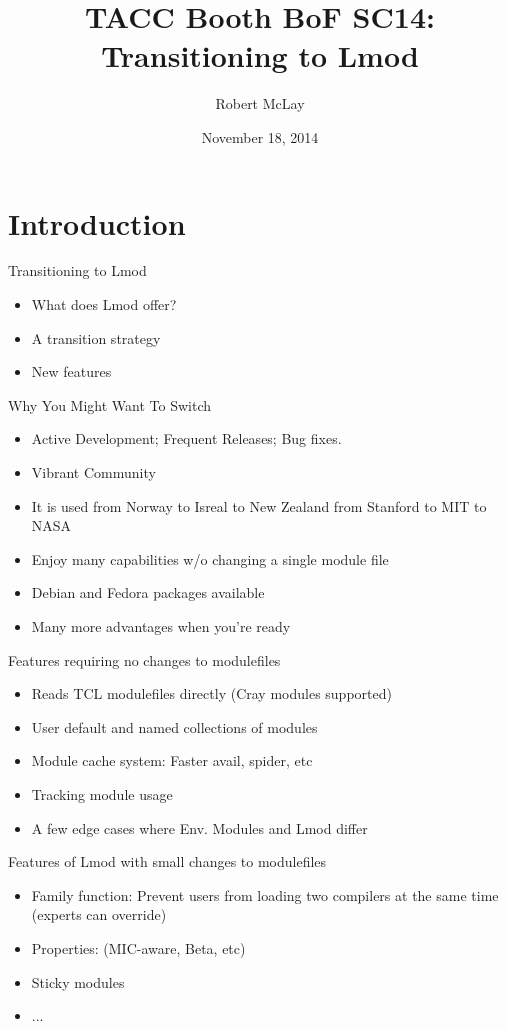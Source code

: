 \documentclass{beamer}
\title{TACC Booth BoF SC14: Transitioning to Lmod}
\author{Robert McLay}
\institute{The Texas Advanced Computing Center}
\date{November 18, 2014}  %
\begin{document}
\begin{frame}
  \titlepage
\end{frame}

\section{Introduction}

\begin{frame}{Transitioning to Lmod}
  \begin{itemize}
    \item What does Lmod offer?
    \item A transition strategy
    \item New features
  \end{itemize}
\end{frame}


\begin{frame}{Why You Might Want To Switch}
  \begin{itemize}
    \item Active Development;  Frequent Releases; Bug fixes.
    \item Vibrant Community
    \item It is used from Norway to Isreal to New Zealand from Stanford to MIT to NASA
    \item Enjoy many capabilities w/o changing a single module file
    \item Debian and Fedora packages available
    \item Many more advantages when you're ready
  \end{itemize}
\end{frame}

\begin{frame}{Features requiring no changes to modulefiles}
  \begin{itemize}
    \item Reads TCL modulefiles directly (Cray modules supported)
    \item User default and named collections of modules
    \item Module cache system: Faster avail, spider, etc
    \item Tracking module usage
    \item A few edge cases where Env. Modules and Lmod differ
  \end{itemize}
\end{frame}

\begin{frame}{Features of Lmod with small changes to modulefiles}
  \begin{itemize}
    \item Family function: Prevent users from loading two compilers at
      the same time (experts can override)
    \item Properties: (MIC-aware, Beta, etc)
    \item Sticky modules
    \item ...
  \end{itemize}
\end{frame}
\end{document}
